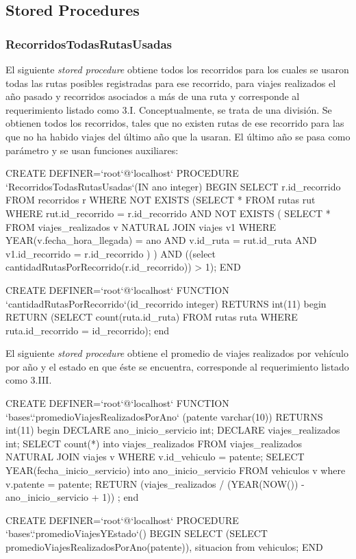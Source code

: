 \subsection{Stored Procedures}

\subsubsection*{RecorridosTodasRutasUsadas}

El siguiente \textit{stored procedure} obtiene todos los recorridos para los cuales se usaron todas las rutas posibles registradas para ese  recorrido, para viajes realizados el a\~no pasado y recorridos asociados a más de una ruta y corresponde al requerimiento listado como 3.I.
Conceptualmente, se trata de una divisi\'on. Se obtienen todos los recorridos, tales que no existen rutas de ese recorrido para las que no ha habido viajes del \'ultimo a\~no que la usaran. El \'ultimo a\~no se pasa como par\'ametro y se usan funciones auxiliares:

\begin{sql}
CREATE DEFINER=`root`@`localhost` PROCEDURE  
	`RecorridosTodasRutasUsadas`(IN ano integer)
BEGIN
		       SELECT r.id_recorrido
	       	       FROM recorridos r
	       	       WHERE NOT EXISTS
			 (SELECT *
			  FROM rutas rut
			  WHERE rut.id_recorrido = r.id_recorrido AND NOT EXISTS (
				SELECT *
				 FROM viajes_realizados v
				 NATURAL JOIN viajes v1
				 WHERE YEAR(v.fecha_hora_llegada) = ano
				       AND v.id_ruta = rut.id_ruta
				       AND v1.id_recorrido = r.id_recorrido
				) 
			 )			
		      AND ((select cantidadRutasPorRecorrido(r.id_recorrido)) > 1);
		END
		
CREATE DEFINER=`root`@`localhost` FUNCTION  
`cantidadRutasPorRecorrido`(id_recorrido integer) RETURNS int(11)
begin
    RETURN (SELECT count(ruta.id_ruta) FROM rutas ruta WHERE ruta.id_recorrido = id_recorrido);
end
\end{sql}

El siguiente \textit{stored procedure} obtiene el promedio de viajes realizados por veh\'iculo por a\~no y el estado en que \'este se encuentra, corresponde al requerimiento listado como 3.III.

\begin{sql}
CREATE DEFINER=`root`@`localhost` FUNCTION  `bases`.`promedioViajesRealizadosPorAno`
								(patente varchar(10)) RETURNS int(11)
begin
    DECLARE ano_inicio_servicio int;
    DECLARE viajes_realizados int;
    SELECT count(*) into viajes_realizados FROM viajes_realizados 
    		NATURAL JOIN viajes v WHERE  v.id_vehiculo = patente;
    SELECT YEAR(fecha_inicio_servicio)  into ano_inicio_servicio 
    		FROM vehiculos v where v.patente = patente;
    RETURN (viajes_realizados / (YEAR(NOW()) - ano_inicio_servicio + 1)) ;
end

CREATE DEFINER=`root`@`localhost` PROCEDURE  `bases`.`promedioViajesYEstado`()
BEGIN
		SELECT (SELECT promedioViajesRealizadosPorAno(patente)), situacion from vehiculos;
		END
		
		
\end{sql}

